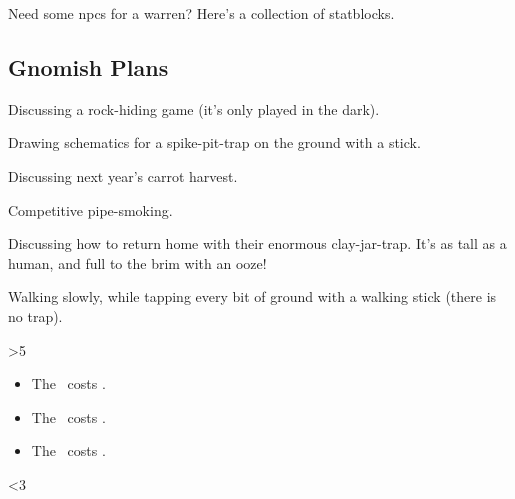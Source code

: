 \documentclass[10pt,twoside]{book}
\begin{document}
\frontmatter


\noindent
Need some \glspl{npc} for a warren?
Here's a collection of \glspl{statblock}.

\clearpage
\pagestyle{minizine}

\subsection{Gnomish Plans}

\begin{dlist}
  \item Discussing a rock-hiding game (it's only played in the dark).
  \item Drawing schematics for a spike-pit-trap on the ground with a stick.
  \item Discussing next year's carrot harvest.
  \item Competitive pipe-smoking.
  \item Discussing how to return home with their enormous clay-jar-trap.
  It's as tall as a human, and full to the brim with an ooze!
  \item Walking slowly, while tapping every bit of ground with a walking stick
  (there is no trap).
\end{dlist}

\jelly

\clearpage

\ifnum\value{r12}>5

  \begin{itemize}
    \item The \lootTalisman\ costs .

    \showTalisman
    \item The \lootTalisman\ costs .

    \showTalisman
    \item The \lootTalisman\ costs .

    \showTalisman
  \end{itemize}
\else
  \gnome
\fi

\gnome

\ifnum\thepage<3
  \gnomishsoldier
\fi

\gnomishsoldier

\clearpage
\gnomishillusionist

\showStdSpells
\end{document}
